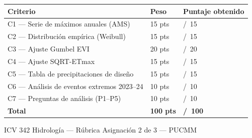 \documentclass[11pt]{article}
\begin{document}
\begin{tabularx}{\textwidth}{%
    >{\raggedright\arraybackslash}X
    >{\centering\arraybackslash}p{2.0cm}
    >{\centering\arraybackslash}p{2.6cm}}
\toprule
\rowcolor{teal}
{\color{white}\bfseries Criterio}&
{\color{white}\bfseries Peso}&
{\color{white}\bfseries Puntaje obtenido}\\
\midrule
C1 --- Serie de máximos anuales (AMS) & \num{15} pts & \quad/~15 \\
C2 --- Distribución empírica (Weibull) & \num{15} pts & \quad/~15 \\
C3 --- Ajuste Gumbel EVI & \num{20} pts & \quad/~20 \\
C4 --- Ajuste SQRT-ETmax & \num{15} pts & \quad/~15 \\
C5 --- Tabla de precipitaciones de diseño & \num{15} pts & \quad/~15 \\
C6 --- Análisis de eventos extremos 2023--24 & \num{10} pts & \quad/~10 \\
C7 --- Preguntas de análisis (P1--P5) & \num{10} pts & \quad/~10 \\
\midrule
\rowcolor{lightgrey}
\bfseries Total & \bfseries\num{100} pts & \bfseries\quad/~100 \\
\bottomrule
\end{tabularx}

\vspace{1em}
\begin{tcolorbox}[enhanced, colback=white, colframe=midgrey,
  boxrule=0.5pt, arc=2pt, left=6pt, right=6pt, top=6pt, bottom=52pt,
  title=\textbf{Comentarios generales},
  fonttitle=\small\bfseries\color{darkblue},
  attach boxed title to top left={yshift=-2mm,xshift=4mm},
  boxed title style={colback=white,colframe=midgrey}]
\end{tcolorbox}

\vfill
\begin{center}
  {\small\color{midgrey}
    ICV 342 Hidrología --- Rúbrica Asignación 2 de 3 --- PUCMM}
\end{center}
\end{document}
